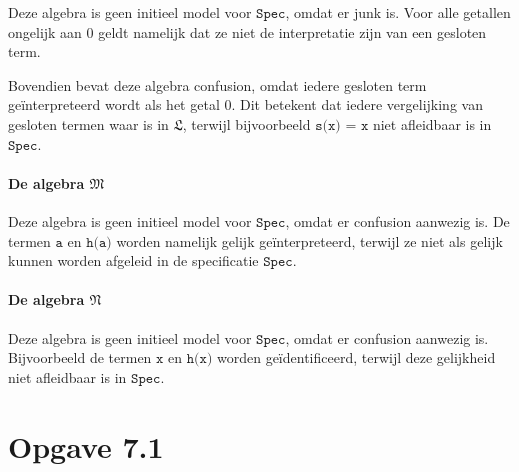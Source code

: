 \documentclass[a4paper,11pt]{article}
\begin{document}
\begin{description}
Deze algebra is geen initieel model voor $\texttt{Spec}$, omdat er junk
is. Voor alle getallen ongelijk aan 0 geldt namelijk dat ze niet de
interpretatie zijn van een gesloten term.

Bovendien bevat deze algebra confusion, omdat iedere gesloten term
ge\"interpreteerd wordt als het getal 0. Dit betekent dat iedere vergelijking
van gesloten termen waar is in $\mathfrak{L}$, terwijl bijvoorbeeld
$\texttt{s(x) = x}$ niet afleidbaar is in $\texttt{Spec}$.

\paragraph{De algebra $\mathfrak{M}$}

Deze algebra is geen initieel model voor $\texttt{Spec}$, omdat er confusion
aanwezig is. De termen $\texttt{a}$ en $\texttt{h(a)}$ worden namelijk gelijk
ge\"interpreteerd, terwijl ze niet als gelijk kunnen worden afgeleid in de
specificatie $\texttt{Spec}$.

\paragraph{De algebra $\mathfrak{N}$}

Deze algebra is geen initieel model voor $\texttt{Spec}$, omdat er
confusion aanwezig is. Bijvoorbeeld de termen $\texttt{x}$ en $\texttt{h(x)}$
worden ge\"identificeerd, terwijl deze gelijkheid niet afleidbaar is in
$\texttt{Spec}$.

\end{description}


\section*{Opgave 7.1}
\end{document}
